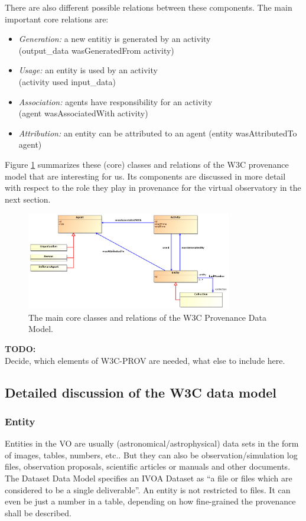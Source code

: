 \documentclass[11pt,a4paper]{ivoa}
\newcommand{\TODO}[1]{%
    \noindent%
    \colorbox{todocolor}{%
            \parbox{0.85\linewidth}{\sffamily \textbf{TODO:}\\
            #1}
    }%
    \vspace{2pt}

}
\begin{document}
\noindent
There are also different possible relations between these components. The main important core relations are:
\begin{itemize}
\item \emph{Generation:} a new entitiy is generated by an activity\\
        (output\_data wasGeneratedFrom activity)
\item \emph{Usage:} an entity is used by an activity\\
        (activity used input\_data)
\item \emph{Association:} agents have responsibility for an activity\\
        (agent wasAssociatedWith activity)
\item \emph{Attribution:} an entity can be attributed to an agent (entity wasAttributedTo agent)
\end{itemize}

Figure \ref{fig:w3cclasses} summarizes these (core) classes and relations of the W3C provenance model that are interesting for us.
Its components are discussed in more detail with respect to the role they play in provenance for the virtual observatory in the next section.

\begin{figure}
\centering
\includegraphics[width=0.8\textwidth]{ProvDM-W3C-classdiagram.png}
\caption{The main core classes and relations of the W3C Provenance Data Model.}
\label{fig:w3cclasses}
\end{figure}


\TODO{Decide, which elements of W3C-PROV are needed, what else to include here.}


\subsection{Detailed discussion of the W3C data model}

\subsubsection{Entity}
Entities in the VO are usually (astronomical/astrophysical) data sets in the form of images, tables, numbers, etc.. But they can also be observation/simulation log files, observation proposals, scientific articles or manuals and other documents. The Dataset Data Model \citep{std:DatasetDM} specifies an IVOA Dataset as ``a file or files which are considered to be a single deliverable''. An entity is not restricted to files. It can even be just a number in a table, depending on how fine-grained the provenance shall be described.
\end{document}
